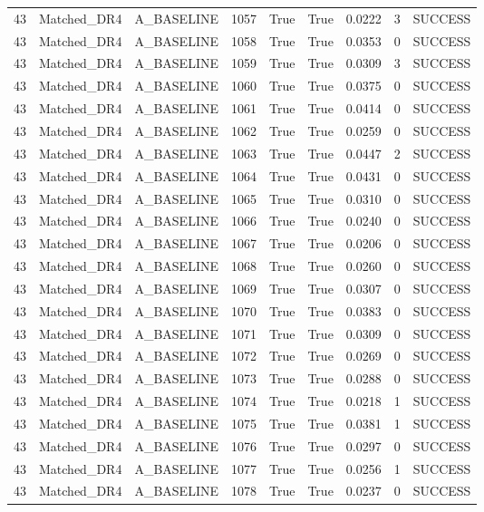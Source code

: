 \documentclass[11pt,a4paper,oneside]{book}
\begin{document}
\begin{longtable}{l l l l l l l l l}
43 & Matched\_DR4 & A\_BASELINE & 1057 & True & True & 0.0222 & 3 & SUCCESS \\
43 & Matched\_DR4 & A\_BASELINE & 1058 & True & True & 0.0353 & 0 & SUCCESS \\
43 & Matched\_DR4 & A\_BASELINE & 1059 & True & True & 0.0309 & 3 & SUCCESS \\
43 & Matched\_DR4 & A\_BASELINE & 1060 & True & True & 0.0375 & 0 & SUCCESS \\
43 & Matched\_DR4 & A\_BASELINE & 1061 & True & True & 0.0414 & 0 & SUCCESS \\
43 & Matched\_DR4 & A\_BASELINE & 1062 & True & True & 0.0259 & 0 & SUCCESS \\
43 & Matched\_DR4 & A\_BASELINE & 1063 & True & True & 0.0447 & 2 & SUCCESS \\
43 & Matched\_DR4 & A\_BASELINE & 1064 & True & True & 0.0431 & 0 & SUCCESS \\
43 & Matched\_DR4 & A\_BASELINE & 1065 & True & True & 0.0310 & 0 & SUCCESS \\
43 & Matched\_DR4 & A\_BASELINE & 1066 & True & True & 0.0240 & 0 & SUCCESS \\
43 & Matched\_DR4 & A\_BASELINE & 1067 & True & True & 0.0206 & 0 & SUCCESS \\
43 & Matched\_DR4 & A\_BASELINE & 1068 & True & True & 0.0260 & 0 & SUCCESS \\
43 & Matched\_DR4 & A\_BASELINE & 1069 & True & True & 0.0307 & 0 & SUCCESS \\
43 & Matched\_DR4 & A\_BASELINE & 1070 & True & True & 0.0383 & 0 & SUCCESS \\
43 & Matched\_DR4 & A\_BASELINE & 1071 & True & True & 0.0309 & 0 & SUCCESS \\
43 & Matched\_DR4 & A\_BASELINE & 1072 & True & True & 0.0269 & 0 & SUCCESS \\
43 & Matched\_DR4 & A\_BASELINE & 1073 & True & True & 0.0288 & 0 & SUCCESS \\
43 & Matched\_DR4 & A\_BASELINE & 1074 & True & True & 0.0218 & 1 & SUCCESS \\
43 & Matched\_DR4 & A\_BASELINE & 1075 & True & True & 0.0381 & 1 & SUCCESS \\
43 & Matched\_DR4 & A\_BASELINE & 1076 & True & True & 0.0297 & 0 & SUCCESS \\
43 & Matched\_DR4 & A\_BASELINE & 1077 & True & True & 0.0256 & 1 & SUCCESS \\
43 & Matched\_DR4 & A\_BASELINE & 1078 & True & True & 0.0237 & 0 & SUCCESS \\

\end{longtable}
\end{document}
